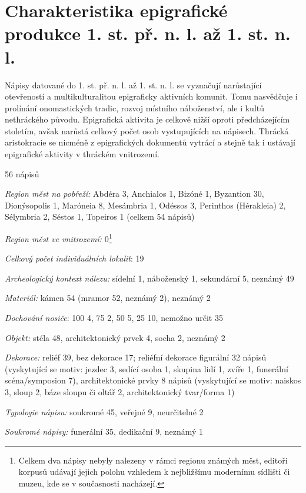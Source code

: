 
\section[charakteristika-epigrafické-produkce-1.-st.-př.-n.-l.-až-1.-st.-n.-l.]{Charakteristika epigrafické produkce 1. st. př. n. l. až 1. st. n. l.}

Nápisy datované do 1. st. př. n. l. až 1. st. n. l. se vyznačují narůstající otevřeností a multikulturalitou epigraficky aktivních komunit. Tomu nasvědčuje i prolínání onomastických tradic, rozvoj místního náboženství, ale i kultů nethráckého původu. Epigrafická aktivita je celkově nižší oproti předcházejícím stoletím, avšak narůstá celkový počet osob vystupujících na nápisech. Thrácká aristokracie se nicméně z epigrafických dokumentů vytrácí a stejně tak i ustávají epigrafické aktivity v thráckém vnitrozemí.

\placetable[none]{}
\starttable[|l|]
\HL
{} 56 nápisů

{\em Region měst na pobřeží:} Abdéra 3, Anchialos 1, Bizóné 1, Byzantion 30, Dionýsopolis 1, Maróneia 8, Mesámbria 1, Odéssos 3, Perinthos (Hérakleia) 2, Sélymbria 2, Séstos 1, Topeiros 1 (celkem 54 nápisů)

{\em Region měst ve vnitrozemí:} 0\footnote{Celkem dva nápisy nebyly nalezeny v rámci regionu známých měst, editoři korpusů udávají jejich polohu vzhledem k nejbližšímu modernímu sídlišti či muzeu, kde se v současnosti nacházejí.}

{\em Celkový počet individuálních lokalit}: 19

{\em Archeologický kontext nálezu:} sídelní 1, náboženský 1, sekundární 5, neznámý 49

{\em Materiál:} kámen 54 (mramor 52, neznámý 2), neznámý 2

{\em Dochování nosiče}: 100  4, 75  2, 50  5, 25  10, nemožno určit 35

{\em Objekt:} stéla 48, architektonický prvek 4, socha 2, neznámý 2

{\em Dekorace:} reliéf 39, bez dekorace 17; reliéfní dekorace figurální 32 nápisů (vyskytující se motiv: jezdec 3, sedící osoba 1, skupina lidí 1, zvíře 1, funerální scéna/symposion 7), architektonické prvky 8 nápisů (vyskytující se motiv: naiskos 3, sloup 2, báze sloupu či oltář 2, architektonický tvar/forma 1)

{\em Typologie nápisu:} soukromé 45, veřejné 9, neurčitelné 2

{\em Soukromé nápisy:} funerální 35, dedikační 9, neznámý 1

